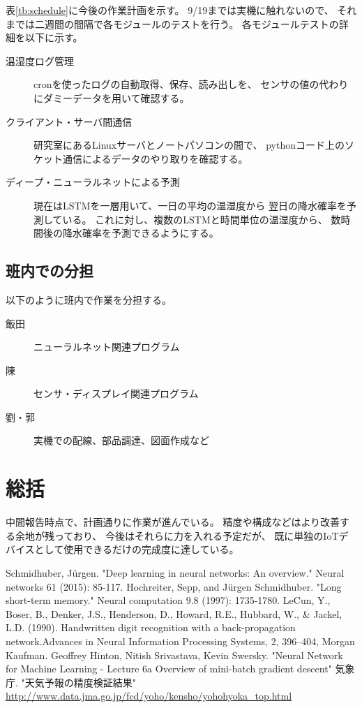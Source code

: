 \documentclass{jsarticle}
\begin{document}
        表\ref{tb:schedule}に今後の作業計画を示す。
        9/19までは実機に触れないので、
        それまでは二週間の間隔で各モジュールのテストを行う。
        各モジュールテストの詳細を以下に示す。
        \begin{description}
          \item[温湿度ログ管理]
            cronを使ったログの自動取得、保存、読み出しを、
            センサの値の代わりにダミーデータを用いて確認する。
          \item[クライアント・サーバ間通信]
            研究室にあるLinuxサーバとノートパソコンの間で、
            pythonコード上のソケット通信によるデータのやり取りを確認する。
          \item[ディープ・ニューラルネットによる予測]
            現在はLSTMを一層用いて、一日の平均の温湿度から
            翌日の降水確率を予測している。
            これに対し、複数のLSTMと時間単位の温湿度から、
            数時間後の降水確率を予測できるようにする。
        \end{description}
      
      \newpage
      \subsection{班内での分担}
        以下のように班内で作業を分担する。
        \begin{description}
          \item[飯田]ニューラルネット関連プログラム
          \item[陳]センサ・ディスプレイ関連プログラム
          \item[劉・郭]実機での配線、部品調達、図面作成など
        \end{description}

    \section{総括}
      中間報告時点で、計画通りに作業が進んでいる。
      精度や構成などはより改善する余地が残っており、
      今後はそれらに力を入れる予定だが、
      既に単独のIoTデバイスとして使用できるだけの完成度に達している。
      
  
  \begin{thebibliography}{9}
     Schmidhuber, Jürgen. "Deep learning in neural networks: An overview." Neural networks 61 (2015): 85-117.
     Hochreiter, Sepp, and Jürgen Schmidhuber. "Long short-term memory." Neural computation 9.8 (1997): 1735-1780.
     LeCun, Y., Boser, B., Denker, J.S., Henderson, D., Howard, R.E., Hubbard, W., \& Jackel, L.D. (1990). Handwritten digit recognition with a back-propagation network.Advances in Neural Information Processing Systems, 2, 396–404, Morgan Kaufman.
     Geoffrey Hinton, Nitish Srivastava, Kevin Swersky. "Neural Network for Machine Learning - Lecture 6a Overview of mini-batch gradient descent"
     気象庁. "天気予報の精度検証結果" \url{http://www.data.jma.go.jp/fcd/yoho/kensho/yohohyoka_top.html}
  \end{thebibliography}
    
\end{document}

